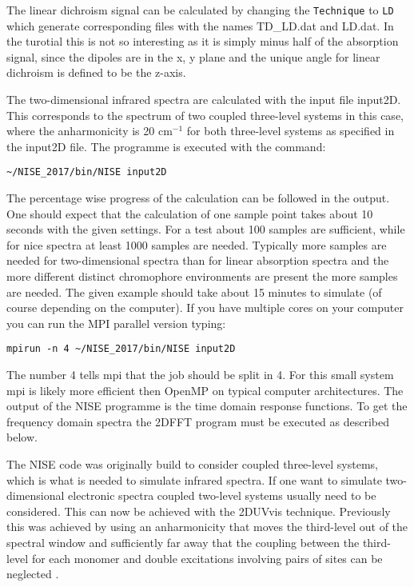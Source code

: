The linear dichroism signal can be calculated by changing the {\tt Technique} to {\tt LD} which generate corresponding files with the names TD\_LD.dat and LD.dat. In the turotial this is 
not so interesting as it is simply minus half of the absorption signal, since the dipoles are in the 
x, y plane and the unique angle for linear dichroism is defined to be the z-axis.

The two-dimensional infrared spectra are calculated with the input file input2D. This corresponds to the spectrum of two coupled three-level systems in this case, where the anharmonicity is 20 cm$^{-1}$ for both three-level systems as specified in the input2D file. The programme is executed with the command:
\begin{verbatim}
~/NISE_2017/bin/NISE input2D
\end{verbatim}
The percentage wise progress of the calculation can be followed in the output. One should expect that the calculation of one sample point takes about 10 seconds with the given settings. For a test about 100 samples are sufficient, while for nice spectra at least 1000 samples are needed. Typically more samples are needed for two-dimensional spectra than for linear absorption spectra and the more different distinct chromophore environments are present the more samples are needed. The given example should take about 15 minutes to simulate (of course depending on the computer).
If you have multiple cores on your computer you can run the MPI parallel version typing:
\begin{verbatim}
mpirun -n 4 ~/NISE_2017/bin/NISE input2D
\end{verbatim}
The number 4 tells mpi that the job should be split in 4. For this small system mpi is likely more efficient then OpenMP on typical computer architectures. The output of the NISE programme is the time domain response functions. To get the frequency domain spectra the 2DFFT program must be executed as described below.

The NISE code was originally build to consider coupled three-level systems, which is what is needed to simulate infrared spectra. If one want to simulate two-dimensional electronic spectra coupled two-level systems usually need to be considered. This can now be achieved with the 2DUVvis technique. Previously this was achieved by using an anharmonicity that moves the third-level out of the spectral window and sufficiently far away that the coupling between the third-level for each monomer and double excitations involving pairs of sites can be neglected \cite{Olbrich.2011.JPCB.115.8609,Liang.2012.JCTC.8.1706}. 


